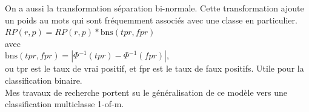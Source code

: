 \begin{frame}[t]
	
	On a aussi la transformation séparation bi-normale. Cette transformation ajoute un poids au mots qui sont fréquemment associés avec une classe en particulier. \\
	$RP(r, p) = RP(r, p) * \textrm{bns}(tpr, fpr)$\\
	avec\\
	$\textrm{bns}(tpr, fpr) = |\Phi^{-1}(tpr) - \Phi^{-1}(fpr)| $,\\
	ou tpr est le taux de vrai positif, et fpr est le taux de faux positifs. Utile pour la classification binaire. \\
	
	Mes travaux de recherche portent su le généralisation de ce modèle vers une classification multiclasse 1-of-m.
	
\end{frame}




